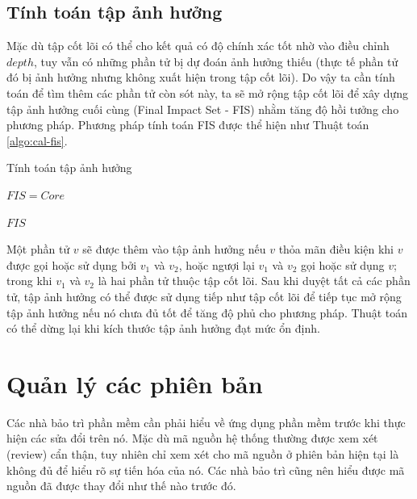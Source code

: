 \documentclass[12pt]{report}
\newenvironment{thuattoan}[1][h]
  {\renewcommand{\algorithmcfname}{Thuật toán}
   \begin{algorithm}[#1]
  }{\end{algorithm}}
\begin{document}
\subsection{Tính toán tập ảnh hưởng}
Mặc dù tập cốt lõi có thể cho kết quả có độ chính xác tốt nhờ vào điều chỉnh $depth$, tuy vẫn có những phần tử bị dự đoán ảnh hưởng thiếu (thực tế phần tử đó bị ảnh hưởng nhưng không xuất hiện trong tập cốt lõi). Do vậy ta cần tính toán để tìm thêm các phần tử còn sót này, ta sẽ mở rộng tập cốt lõi để xây dựng tập ảnh hưởng cuối cùng (Final Impact Set - FIS) nhằm tăng độ hồi tưởng cho phương pháp. Phương pháp tính toán FIS được thể hiện như Thuật toán \ref{algo:cal-fis}.

\begin{thuattoan}
	\label{algo:cal-fis}
	\caption{Tính toán tập ảnh hưởng}
	
	
	$FIS = Core$\;
	 {
	}
	
	\Return $FIS$\;
\end{thuattoan}

Một phần tử $v$ sẽ được thêm vào tập ảnh hưởng nếu $v$ thỏa mãn điều kiện khi $v$ được gọi hoặc sử dụng bởi $v_1$ và $v_2$, hoặc ngượi lại $v_1$ và $v_2$ gọi hoặc sử dụng $v$; trong khi $v_1$ và $v_2$ là hai phần tử thuộc tập cốt lõi. Sau khi duyệt tất cả các phần tử, tập ảnh hưởng có thể được sử dụng tiếp như tập cốt lõi để tiếp tục mở rộng tập ảnh hưởng nếu nó chưa đủ tốt để tăng độ phủ cho phương pháp. Thuật toán có thể dừng lại khi kích thước tập ảnh hưởng đạt mức ổn định.

\section{Quản lý các phiên bản}
Các nhà bảo trì phần mềm cần phải hiểu về ứng dụng phần mềm trước khi thực hiện các sửa đổi trên nó. Mặc dù mã nguồn hệ thống thường được xem xét (review) cẩn thận, tuy nhiên chỉ xem xét cho mã nguồn ở phiên bản hiện tại là không đủ để hiểu rõ sự tiến hóa của nó. Các nhà bảo trì cũng nên hiểu được mã nguồn đã được thay đổi như thế nào trước đó.
\end{document}
